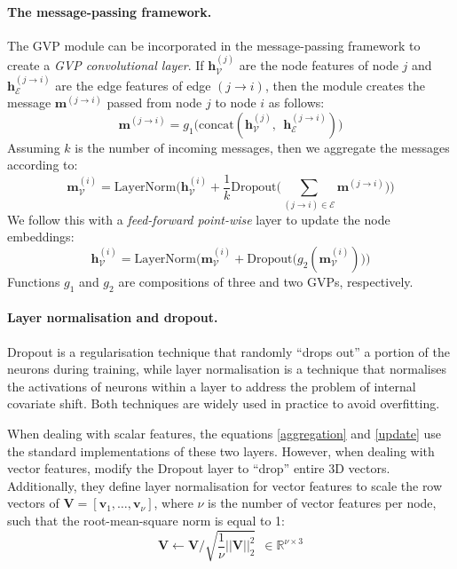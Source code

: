 \paragraph{The message-passing framework.} The GVP module can be incorporated in the message-passing framework to create a \textit{GVP convolutional layer}. If $\mathbf{h}_{\mathcal{V}}^{(j)}$ are the node features of node $j$ and $\mathbf{h}_{\mathcal{E}}^{(j\rightarrow i)}$ are the edge features of edge $(j \rightarrow i)$, then the module creates the message $\mathbf{m}^{(j\rightarrow i)}$ passed from node $j$ to node $i$ as follows:
\begin{equation}
\mathbf{m}^{(j\rightarrow i)} = g_1\Big(\text{concat}(\mathbf{h}_{\mathcal{V}}^{(j)}, ~~\mathbf{h}_{\mathcal{E}}^{(j \rightarrow i)})\Big) 
\end{equation}
Assuming $k$ is the number of incoming messages, then we aggregate the messages according to:
\begin{equation}
\mathbf{m}_{\mathcal{V}}^{(i)}= \text{LayerNorm}\Big(\mathbf{h}_{\mathcal{V}}^{(i)} + \frac{1}{k}\text{Dropout}\big(\sum_{(j \rightarrow i)\in\mathcal{E}}\mathbf{m}^{(j\rightarrow i)}\big)\Big)
\label{aggregation}
\end{equation}
We follow this with a \textit{feed-forward point-wise} layer to update the node embeddings:
\begin{equation}
    \mathbf{h}_{\mathcal{V}}^{(i)}= \text{LayerNorm}\Big(\mathbf{m}_{\mathcal{V}}^{(i)} + \text{Dropout}\big(g_2(\mathbf{m}_{\mathcal{V}}^{(i)})\big)\Big)
\label{update}
\end{equation}
Functions $g_1$ and $g_2$ are compositions of three and two GVPs, respectively.

\paragraph{Layer normalisation and dropout.} Dropout \cite{dropout} is a regularisation technique that randomly ``drops out'' a portion of the neurons during training, while layer normalisation \cite{layernorm} is a technique that normalises the activations of neurons within a layer to address the problem of internal covariate shift. Both techniques are widely used in practice to avoid overfitting. 

When dealing with scalar features, the equations \ref{aggregation} and \ref{update} use the standard implementations of these two layers. However, when dealing with vector features, \citet{gvp1} modify the Dropout layer to ``drop'' entire 3D vectors. Additionally, they define layer normalisation for vector features to scale the row vectors of $\mathbf{V} =[\mathbf{v}_1, \dots, \mathbf{v}_{\nu}]$, where $\nu$ is the number of vector features per node, such that the root-mean-square norm is equal to 1: 
\begin{equation}
    \mathbf{V} \leftarrow \mathbf{V}/\sqrt{\frac{1}{\nu}||\mathbf{V}||_2^2} ~~\in \mathbb{R}^{\nu\times 3}  
\end{equation}


